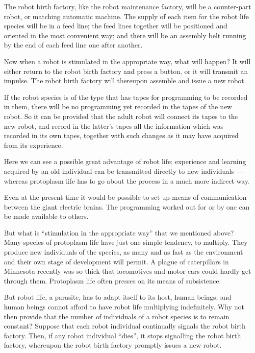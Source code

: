 \documentclass[11pt]{article}
\begin{document}
The robot birth factory, like the robot maintenance factory, will be a
counter-part robot, or matching automatic machine. The supply of each item for
the robot life species will be in a feed line; the feed lines together will be
positioned and oriented in the most convenient way; and there will be an
assembly belt running by the end of each feed line one after another.

Now when a robot is stimulated in the appropriate way, what will happen? It
will either return to the robot birth factory and press a button, or it will
transmit an impulse. The robot birth factory will thereupon assemble and issue
a new robot.

If the robot species is of the type that has tapes for programming to be
recorded in them, there will be no programming yet recorded in the tapes of the
new robot. So it can be provided that the adult robot will connect its tapes to
the new robot, and record in the latter's tapes all the information which was
recorded in its own tapes, together with such changes as it may have acquired
from its experience.

Here we can see a possible great advantage of robot life; experience and
learning acquired by an old individual can be transmitted directly to new
individuals --- whereas protoplasm life has to go about the process in a much
more indirect way.

Even at the present time it would be possible to set up means of communication
between the giant electric brains. The programming worked out for or by one can
be made available to others.

But what is ``stimulation in the appropriate way'' that we mentioned above?
Many species of protoplasm life have just one simple tendency, to multiply.
They produce new individuals of the species, as many and as fast as the
environment and their own stage of development will permit. A plague of
caterpillars in Minnesota recently was so thick that locomotives and motor cars
could hardly get through them. Protoplasm life often presses on its means of
subsistence.

But robot life, a parasite, has to adapt itself to its host, human beings; and
human beings cannot afford to have robot life multiplying indefinitely. Why not
then provide that the number of individuals of a robot species is to remain
constant? Suppose that each robot individual continually signals the robot birth
factory. Then, if any robot individual ``dies'', it stops signalling the robot
birth factory, whereupon the robot birth factory promptly issues a new robot.
\end{document}
